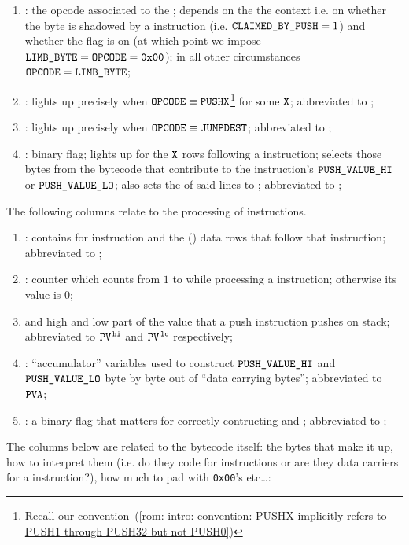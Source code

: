 \begin{enumerate}[resume]
    \item \romColumnOpcode{}:
	the opcode associated to the \romColumnLimbByte{};
	depends on the the context i.e. on whether the byte is shadowed by a  instruction (i.e. \( \texttt{CLAIMED\_BY\_PUSH}{}=1 \)) and whether the \romColumnPadding{} flag is on (at which point we impose $\texttt{LIMB\_BYTE}=\texttt{OPCODE}=\texttt{0x00}$);
	in all other circumstances \( \texttt{OPCODE}{} = \texttt{LIMB\_BYTE}{} \);
    \item \romColumnOpcodeIsPush{}:
	lights up precisely when
	$\texttt{OPCODE} \equiv \texttt{PUSHX}$\footnote{Recall our convention~(\ref{rom: intro: convention: PUSHX implicitly refers to PUSH1 through PUSH32 but not PUSH0})}
	for some $\texttt{X}$;
	abbreviated to \ip{};
    \item \romColumnOpcodeIsJumpDest{}:
	lights up precisely when $\texttt{OPCODE} \equiv \texttt{JUMPDEST}$;
	abbreviated to \isValidJumpDestination{};
    \item \romColumnClaimedByPush{}:
	binary flag;
	lights up for the $\texttt{X}$ rows following a  instruction;
	selects those bytes from the bytecode that contribute to the  instruction's $\texttt{PUSH\_VALUE\_HI}$ or $\texttt{PUSH\_VALUE\_LO}$;
	also sets the \romColumnOpcode{} of said lines to ;
	abbreviated to \romColumnClaimedByPush{};
\end{enumerate}
The following columns relate to the processing of  instructions.
\begin{enumerate}[resume]
    \item \PP{}:
	contains  for  instruction and the () data rows that follow that instruction;
	abbreviated to \pp{};
    \item \CP{}:
	counter which counts from $1$ to \PP{} while processing a  instruction;
	otherwise its value is $0$;
    \item \romColumnPushValueHi{} and \romColumnPushValueLo{}
	high and low part of the value that a push instruction pushes on stack;
	abbreviated to $\texttt{PV}^{\mathtt{\,hi}}$ and $\texttt{PV}^{\mathtt{\,lo}}$ respectively;
    \item \PVA:
	``accumulator'' variables used to construct $\texttt{PUSH\_VALUE\_HI}$ and $\texttt{PUSH\_VALUE\_LO}$ byte by byte out of ``data carrying bytes'';
	abbreviated to $\texttt{PVA}$;
    \item \PFB{}:
	a binary flag that matters for correctly contructing \romColumnPushValueHi{} and \romColumnPushValueLo{};
	abbreviated to \pfb{};
\end{enumerate}
The columns below are related to the bytecode itself: the bytes that make it up, how to interpret them (i.e. do they code for instructions or are they data carriers for a  instruction?), how much to pad with \texttt{0x00}'s etc\dots:


